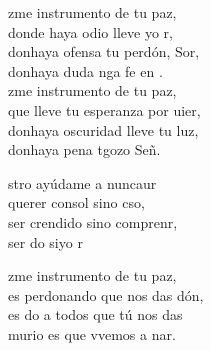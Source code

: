 \begin{cancion}%
	zme instrumento de tu paz,\\
	donde haya odio lleve yo r,\\
	donhaya ofensa tu perdón, Sor,\\
	donhaya duda nga fe en . \\
	\jump
	zme instrumento de tu paz,\\
	que lleve tu esperanza por uier,\\
	donhaya oscuridad lleve tu luz,\\
	donhaya pena tgozo Señ. \jump\\
	\begin{chorus}%
		stro ayúdame a nuncaur\\
		querer  consol sino cso,\\
		ser crendido sino comprenr,\\
		ser do siyo r\jump\\
	\end{chorus}%
	zme instrumento de tu paz,\\
	es perdonando que nos das dón,\\
	es do a todos que tú nos das\\
	murio es que vvemos a nar.\\
	\jump
\end{cancion}%
